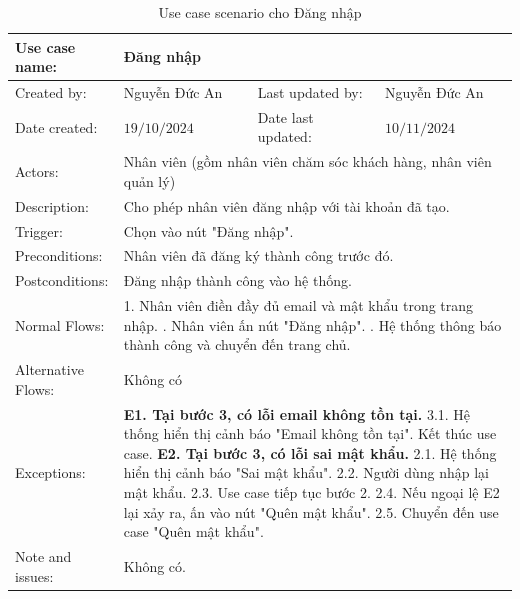 \begin{table}[H]
	\centering
	\begin{tabular}{|l|l|l|l|} 
		\hline Use case name: & \multicolumn{3}{|l|}{Đăng nhập} \\ 
		\hline Created by: & Nguyễn Đức An & Last updated by: & Nguyễn Đức An \\ 
		\hline Date created: & $19 / 10 / 2024$ & Date last updated: & $10 / 11 / 2024$\\ 
		\hline Actors: & \multicolumn{3}{|l|}{ Nhân viên (gồm nhân viên chăm sóc khách hàng, nhân viên quản lý) } \\ 
		\hline Description: & \multicolumn{3}{|p{12cm}|}{ Cho phép nhân viên đăng nhập với tài khoản đã tạo. } \\ 
		\hline Trigger: & \multicolumn{3}{|p{12cm}|}{ Chọn vào nút "Đăng nhập". } \\ 
		\hline Preconditions: & \multicolumn{3}{|p{12cm}|}{ Nhân viên đã đăng ký thành công trước đó. } \\ 
		\hline Postconditions: & \multicolumn{3}{|p{12cm}|}{ Đăng nhập thành công vào hệ thống. } \\ 
		\hline Normal Flows: & \multicolumn{3}{|p{12cm}|}{
			1. Nhân viên điền đầy đủ email và mật khẩu trong trang nhập. \newline
			2. Nhân viên ấn nút "Đăng nhập". \newline
			3. Hệ thống thông báo thành công và chuyển đến trang chủ. 
		} \\ 
		\hline Alternative Flows: & \multicolumn{3}{|p{12cm}|}{
			Không có
		} \\ 
		\hline Exceptions: & \multicolumn{3}{|p{12cm}|}{
			\textbf{E1. Tại bước 3, có lỗi email không tồn tại.} \newline
			\hspace{0.5cm}3.1. Hệ thống hiển thị cảnh báo "Email không tồn tại". \newline
            \hspace{0.5cm}Kết thúc use case. \newline
			\textbf{E2. Tại bước 3, có lỗi sai mật khẩu.} \newline
            \hspace{0.5cm}2.1. Hệ thống hiển thị cảnh báo "Sai mật khẩu". \newline
			\hspace{0.5cm}2.2. Người dùng nhập lại mật khẩu. \newline
			\hspace{0.5cm}2.3. Use case tiếp tục bước 2. \newline
			\hspace{0.5cm}2.4. Nếu ngoại lệ E2 lại xảy ra, ấn vào nút "Quên mật khẩu". \newline
			\hspace{0.5cm}2.5. Chuyển đến use case "Quên mật khẩu". 
		} \\ 
		\hline Note and issues: & \multicolumn{3}{|p{12cm}|}{ Không có. } \\ 
		\hline
	\end{tabular}
	\caption{Use case scenario cho Đăng nhập}
\end{table}



